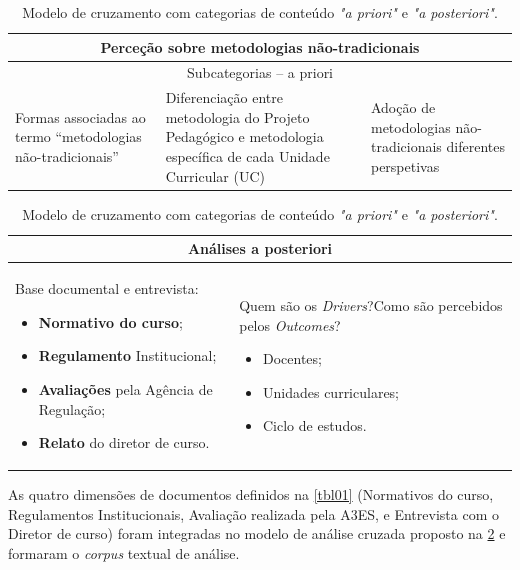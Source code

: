 \documentclass{textolivre}
\begin{document}
\begin{table}[htbp]
\caption{Modelo de cruzamento com categorias de conteúdo \textit{"a priori"} e \textit{"a posteriori"}.}
\label{tbl02}
\begin{tabularx}{\textwidth}{p{}
p{}p{}}
\toprule
\multicolumn{3}{c}{\textbf{Perceção sobre metodologias não-tradicionais}} \\ 
\midrule
\multicolumn{3}{c}{Subcategorias – a priori} \\ 
\midrule
Formas associadas ao termo “metodologias não-tradicionais” &
Diferenciação entre metodologia do Projeto Pedagógico e metodologia específica de cada Unidade Curricular (UC) &
  Adoção de metodologias não-tradicionais diferentes perspetivas \\ \midrule
\end{tabularx}

\begin{tabularx}{\textwidth}{p{}
p{}}
\multicolumn{2}{c}{\textbf{Análises a posteriori}} \\ \midrule
Base documental e entrevista:\newline
\begin{itemize}
    \item \textbf{Normativo do curso};
    \item \textbf{Regulamento} Institucional;
    \item \textbf{Avaliações} pela Agência de Regulação;
    \item \textbf{Relato} do diretor de curso.
\end{itemize} &
Quem são os \textit{Drivers}?\newline Como são percebidos pelos  \textit{Outcomes}? \newline
\begin{itemize}
    \item Docentes;
    \item Unidades curriculares;
    \item Ciclo de estudos.
\end{itemize} \\
\bottomrule
\end{tabularx}
\end{table}

As quatro dimensões de documentos definidos na \cref{tbl01} (Normativos do curso, Regulamentos Institucionais, Avaliação realizada pela A3ES, e Entrevista com o Diretor de curso) foram integradas no modelo de análise cruzada proposto na \cref{tbl02} e formaram o \textit{corpus} textual de análise.
\end{document}
